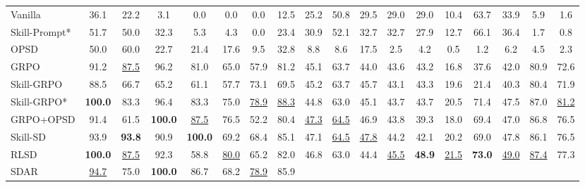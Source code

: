 \documentclass{llmxive}
\begin{document}
\begin{table}[ht!]
{\begin{tabular}{l ccccccc cccccccc cc}
    Vanilla
        & 36.1 & 22.2 & 3.1 & 0.0 & 0.0 & 0.0 & 12.5
        & 25.2 & 50.8 & 29.5 & 29.0 & 29.0 & 10.4 & 63.7 & 33.9
        & 5.9 & 1.6
        \\
    Skill-Prompt*
        & 51.7 & 50.0 & 32.3 & 5.3 & 4.3 & 0.0 & 23.4
        & 30.9 & 52.1 & 32.7 & 32.7 & 27.9 & 12.7 & 66.1 & 36.4
        & 1.7 & 0.8
        \\
    OPSD
        & 50.0 & 60.0 & 22.7 & 21.4 & 17.6 & 9.5 & 32.8
        & 8.8 & 8.6 & 17.5 & 2.5 & 4.2 & 0.5 & 1.2 & 6.2
        & 4.5 & 2.3
        \\
    GRPO
        & 91.2 & \cellcolor{secondcolor}\underline{87.5} & 96.2 & 81.0 & 65.0 & 57.9 & 81.2
        & 45.1 & 63.7 & 44.0 & 43.6 & 43.2 & 16.8 & 37.6 & 42.0
        & 80.9 & 72.6
        \\
    Skill-GRPO
        & 88.5 & 66.7 & 65.2 & 61.1 & 57.7 & 73.1 & 69.5
        & 45.2 & 63.7 & 45.7 & 43.1 & 43.3 & 19.6 & 21.4 & 40.3
        & 80.4 & 71.9
        \\
    Skill-GRPO*
        & \cellcolor{topcolor}\textbf{100.0} & 83.3 & 96.4 & 83.3 & 75.0 & \cellcolor{secondcolor}\underline{78.9} & \cellcolor{secondcolor}\underline{88.3}
        & 44.8 & 63.0 & 45.1 & 43.7 & 43.7 & 20.5 & 71.4 & 47.5
        & 87.0 & \cellcolor{secondcolor}\underline{81.2}
        \\
    GRPO+OPSD
        & 91.4 & 61.5 & \cellcolor{topcolor}\textbf{100.0} & \cellcolor{secondcolor}\underline{87.5} & 76.5 & 52.2 & 80.4
        & \cellcolor{secondcolor}\underline{47.3} & \cellcolor{secondcolor}\underline{64.5} & 46.9 & 43.8 & 39.3 & 18.0 & 69.4 & 47.0
        & 86.8 & 76.5
        \\
    Skill-SD
        & 93.9 & \cellcolor{topcolor}\textbf{93.8} & 90.9 & \cellcolor{topcolor}\textbf{100.0} & 69.2 & 68.4 & 85.1
        & 47.1 & \cellcolor{secondcolor}\underline{64.5} & \cellcolor{secondcolor}\underline{47.8} & 44.2 & 42.1 & 20.2 & 69.0 & 47.8
        & 86.1 & 76.5
        \\
    RLSD
        & \cellcolor{topcolor}\textbf{100.0} & \cellcolor{secondcolor}\underline{87.5} & 92.3 & 58.8 & \cellcolor{secondcolor}\underline{80.0} & 65.2 & 82.0
        & 46.8 & 63.0 & 44.4 & \cellcolor{secondcolor}\underline{45.5} & \cellcolor{topcolor}\textbf{48.9} & \cellcolor{secondcolor}\underline{21.5} & \cellcolor{topcolor}\textbf{73.0} & \cellcolor{secondcolor}\underline{49.0}
        & \cellcolor{secondcolor}\underline{87.4} & 77.3
        \\
    SDAR
        & \cellcolor{secondcolor}\underline{94.7} & 75.0 & \cellcolor{topcolor}\textbf{100.0} & 86.7 & 68.2 & \cellcolor{secondcolor}\underline{78.9} & 85.9

\end{tabular}}
\end{table}
\end{document}
